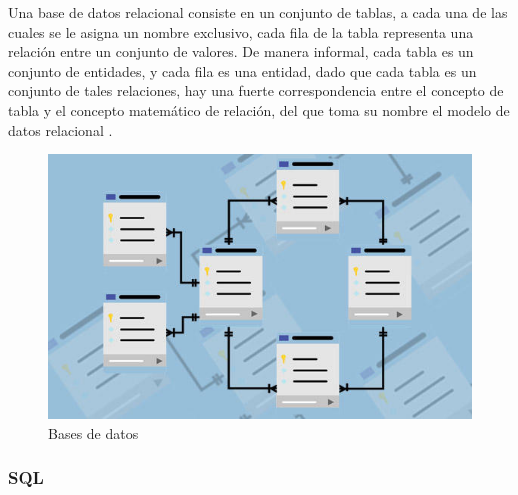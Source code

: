 		{Una base de datos relacional consiste en un conjunto de tablas, a cada una de las cuales se le asigna un nombre exclusivo, cada fila de la tabla representa una relación entre un conjunto de valores. De manera informal, cada tabla es un conjunto de entidades, y cada fila es una entidad, dado que cada tabla es un conjunto de tales relaciones, hay una fuerte correspondencia entre el concepto de tabla y el concepto matemático de relación, del que toma su nombre el modelo de datos relacional \cite{dataBase}.
		
		\begin{figure}[H]
			\centering
			\includegraphics[width=0.8\linewidth]{description/framework/database.jpg}
			\caption{Bases de datos}
		\end{figure}
		}
	
		\subsubsection{SQL}
		
